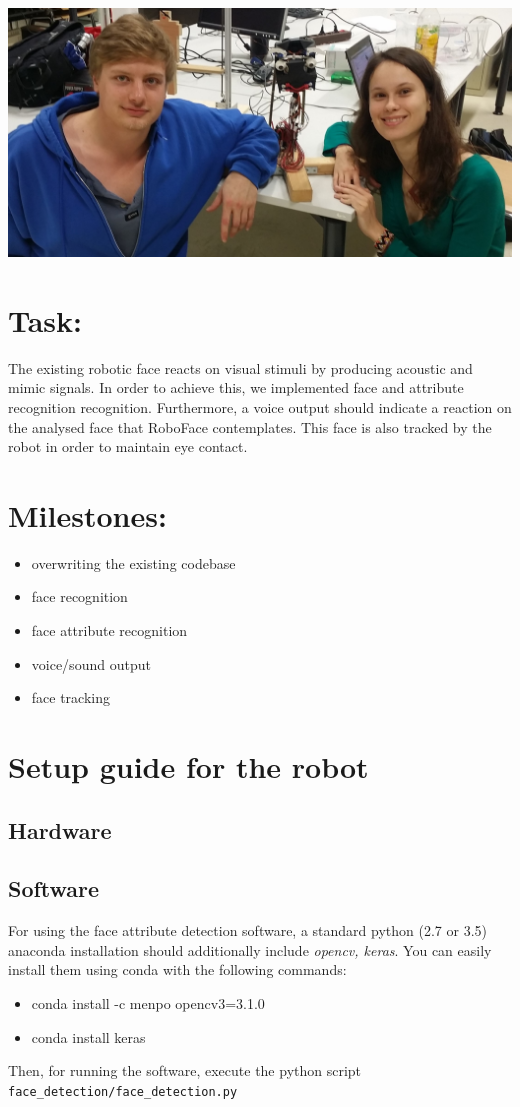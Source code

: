 \documentclass[12.5pt]{scrartcl}
\begin{document}
	\vspace*{8mm}
	\begin{center}
		\includegraphics[width=0.88\linewidth]{images/faceEdited}
	\end{center}
	
	\section{Task:}
	The existing robotic face reacts on visual stimuli by producing acoustic and mimic signals. In order to achieve this, we implemented face and attribute recognition recognition. Furthermore, a voice output should indicate a reaction on the analysed face that RoboFace contemplates. This face is also tracked by the robot in order to maintain eye contact. 
	
	\section{Milestones:}
	\begin{itemize}
		\item overwriting the existing codebase
		\item face recognition
		\item face attribute recognition
		\item voice/sound output
		\item face tracking
	\end{itemize}

	\section{Setup guide for the robot}
	\subsection{Hardware}
	\subsection{Software}
	For using the face attribute detection software, a standard python (2.7 or 3.5) anaconda installation should additionally include \textit{opencv, keras}. You can easily install them using conda with the following commands:
	\begin{itemize}
	\item conda install -c menpo opencv3=3.1.0
	\item conda install keras
	\end{itemize}
	Then, for running the software, execute the python script \texttt{face\_detection/face\_detection.py}
	
\end{document}
